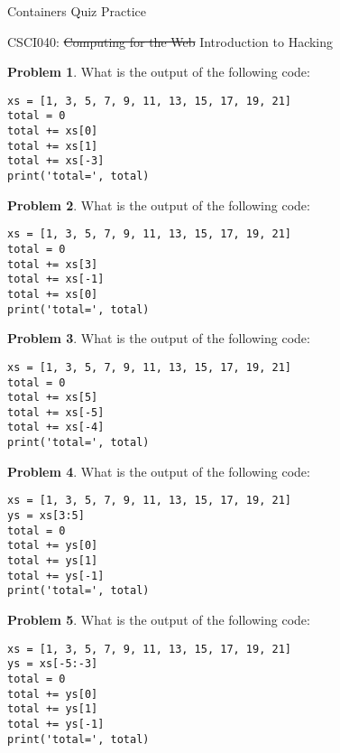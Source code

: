\documentclass[10pt]{article}
\theoremstyle{definition}
\newtheorem{problem}{Problem}
\begin{document}
\begin{center}
    {
\Large
Containers Quiz Practice
}

    \vspace{0.1in}
    CSCI040: \sout{Computing for the Web} Introduction to Hacking

    \vspace{0.1in}
\end{center}


\vspace{0.15in}

\begin{problem}
    What is the output of the following code:
\end{problem}
\begin{lstlisting}
xs = [1, 3, 5, 7, 9, 11, 13, 15, 17, 19, 21]
total = 0
total += xs[0]
total += xs[1]
total += xs[-3]
print('total=', total)
\end{lstlisting}
\vspace{2in}

\begin{problem}
    What is the output of the following code:
\end{problem}
\begin{lstlisting}
xs = [1, 3, 5, 7, 9, 11, 13, 15, 17, 19, 21]
total = 0
total += xs[3]
total += xs[-1]
total += xs[0]
print('total=', total)
\end{lstlisting}
\vspace{2in}

\begin{problem}
    What is the output of the following code:
\end{problem}
\begin{lstlisting}
xs = [1, 3, 5, 7, 9, 11, 13, 15, 17, 19, 21]
total = 0
total += xs[5]
total += xs[-5]
total += xs[-4]
print('total=', total)
\end{lstlisting}
\vspace{2in}

\begin{problem}
    What is the output of the following code:
\end{problem}
\begin{lstlisting}
xs = [1, 3, 5, 7, 9, 11, 13, 15, 17, 19, 21]
ys = xs[3:5]
total = 0
total += ys[0]
total += ys[1]
total += ys[-1]
print('total=', total)
\end{lstlisting}
\vspace{2in}

\begin{problem}
    What is the output of the following code:
\end{problem}
\begin{lstlisting}
xs = [1, 3, 5, 7, 9, 11, 13, 15, 17, 19, 21]
ys = xs[-5:-3]
total = 0
total += ys[0]
total += ys[1]
total += ys[-1]
print('total=', total)
\end{lstlisting}
\vspace{2in}
\end{document}
